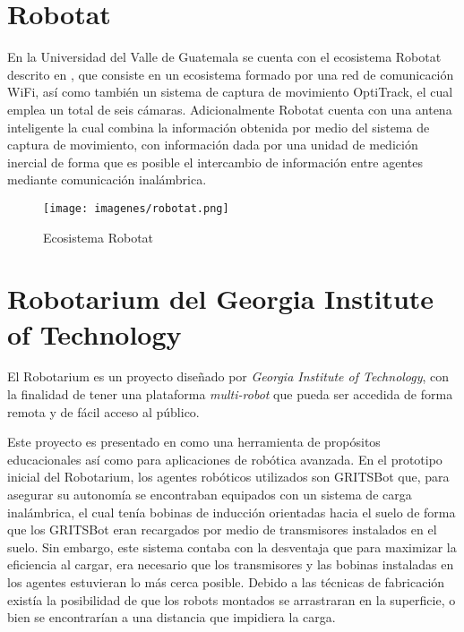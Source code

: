 \section{Robotat}

En la Universidad del Valle de Guatemala se cuenta con el ecosistema Robotat descrito
 en \cite{perafan_montoya_robotat_2022}, que consiste en un ecosistema formado por una red
 de comunicación WiFi, así como también un sistema de captura de movimiento OptiTrack, el 
 cual emplea un total de seis cámaras. Adicionalmente Robotat cuenta con una antena inteligente la cual
 combina la información obtenida por medio del sistema de captura de movimiento, con información dada
 por una unidad de medición inercial de forma que es posible el intercambio de información entre agentes
 mediante comunicación inalámbrica.

\begin{figure}[H]
        \centering
        \texttt{[image: imagenes/robotat.png]}
        \caption{Ecosistema Robotat \cite{perafan_montoya_robotat_2022}}
        \label{fig:robotat}
\end{figure}

\section{Robotarium del Georgia Institute of Technology}

El Robotarium es un proyecto diseñado por \textit{Georgia Institute of Technology}, con la finalidad
de tener una plataforma \textit{multi-robot} que pueda ser accedida de forma remota y de fácil acceso al público.

Este proyecto es presentado en \cite{wilson_robotarium_2021} como una herramienta de propósitos educacionales
así como para aplicaciones de robótica avanzada. 
En el prototipo inicial del Robotarium, los agentes robóticos utilizados son
GRITSBot que, para asegurar su autonomía se encontraban equipados con un sistema de carga inalámbrica,
 el cual tenía bobinas de inducción orientadas hacia el suelo
de forma que los GRITSBot eran recargados por medio de transmisores instalados en el suelo. Sin embargo, este sistema
contaba con la desventaja que para maximizar la eficiencia al cargar,  era necesario que los 
transmisores y las bobinas instaladas en los agentes estuvieran lo más cerca posible. Debido a las técnicas
 de fabricación existía la posibilidad de que los robots montados se arrastraran en la superficie,
o bien se encontrarían a una distancia que impidiera la carga.

